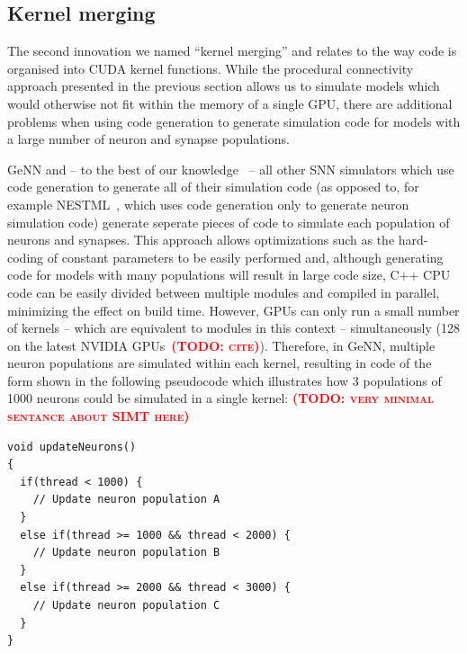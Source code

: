 \documentclass[9pt,twocolumn,twoside,lineno]{pnas-new}
\newcommand{\todo}[1]{\textbf{\textsc{\textcolor{red}{(TODO: #1)}}}}
\begin{document}
\subsection*{Kernel merging}
The second innovation we named ``kernel merging'' and relates to the way code is organised into CUDA kernel functions.
While the procedural connectivity approach presented in the previous section allows us to simulate models which would otherwise not fit within the memory of a single GPU, there are additional problems when using code generation to generate simulation code for models with a large number of neuron and synapse populations.

GeNN and -- to the best of our knowledge~\citep{Blundell2018} -- all other SNN simulators which use code generation to generate all of their simulation code (as opposed to, for example NESTML~\citep{Plotnikov2016}, which uses code generation only to generate neuron simulation code) generate seperate pieces of code to simulate each population of neurons and synapses.
This approach allows optimizations such as the hard-coding of constant parameters to be easily performed and, although generating code for models with many populations will result in large code size, C++ CPU code  can be easily divided between multiple modules and compiled in parallel, minimizing the effect on build time.
However, GPUs can only run a small number of kernels -- which are equivalent to modules in this context --  simultaneously (128 on the latest NVIDIA GPUs~\todo{cite}).
Therefore, in GeNN, multiple neuron populations are simulated within each kernel, resulting in code of the form shown in the following pseudocode which illustrates how 3 populations of 1000 neurons could be simulated in a single kernel:
\todo{very minimal sentance about SIMT here}

\begin{lstlisting}
void updateNeurons()
{
  if(thread < 1000) {
    // Update neuron population A
  }
  else if(thread >= 1000 && thread < 2000) {
    // Update neuron population B
  }
  else if(thread >= 2000 && thread < 3000) {
    // Update neuron population C
  }
}

\end{lstlisting}
\end{document}
